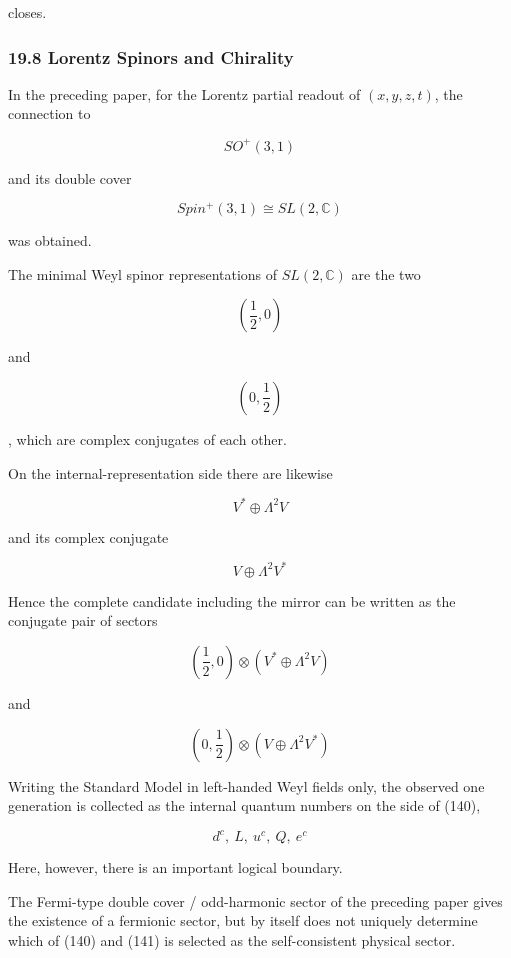 \documentclass[
  a4paper,
]{article}
\begin{document}
closes.

\subsubsection{19.8 Lorentz Spinors and
Chirality}\label{lorentz-spinors-and-chirality}

In the preceding paper, for the Lorentz partial readout of
\((x,y,z,t)\), the connection to

\[
SO^+(3,1)
\]

and its double cover

\[
\boxed{
Spin^+(3,1)
\cong
SL(2,\mathbb C)
}
\tag{135}
\]

was obtained.

The minimal Weyl spinor representations of \(SL(2,\mathbb C)\) are the
two

\[
\boxed{
\left(\frac12,0\right)
}
\tag{136}
\]

and

\[
\boxed{
\left(0,\frac12\right)
}
\tag{137}
\]

, which are complex conjugates of each other.

On the internal-representation side there are likewise

\[
\boxed{
V^*\oplus\Lambda^2V
}
\tag{138}
\]

and its complex conjugate

\[
\boxed{
V\oplus\Lambda^2V^*
}
\tag{139}
\]

Hence the complete candidate including the mirror can be written as the
conjugate pair of sectors

\[
\boxed{
\left(\frac12,0\right)
\otimes
\left(
V^*\oplus\Lambda^2V
\right)
}
\tag{140}
\]

and

\[
\boxed{
\left(0,\frac12\right)
\otimes
\left(
V\oplus\Lambda^2V^*
\right)
}
\tag{141}
\]

Writing the Standard Model in left-handed Weyl fields only, the observed
one generation is collected as the internal quantum numbers on the side
of (140),

\[
d^c,\ L,\ u^c,\ Q,\ e^c
\]

Here, however, there is an important logical boundary.

The Fermi-type double cover / odd-harmonic sector of the preceding paper
gives the existence of a fermionic sector, but by itself does not
uniquely determine which of (140) and (141) is selected as the
self-consistent physical sector.
\end{document}

